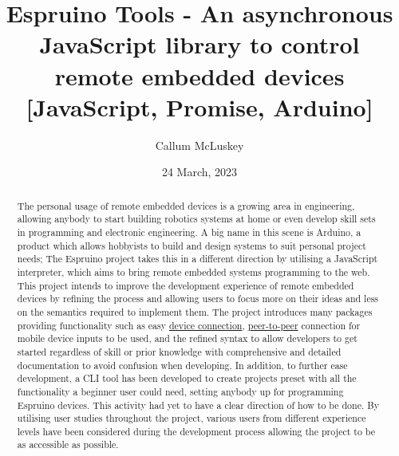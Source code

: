 \documentclass{l4proj}
\begin{document}
\title{Espruino Tools - An asynchronous JavaScript library to control remote embedded devices [JavaScript, Promise, Arduino]}
\author{Callum McLuskey}
\date{24 March, 2023}


\maketitle

\begin{abstract}

    The personal usage of remote embedded devices is a growing area in engineering, allowing anybody to start building robotics systems at home or even develop skill sets in programming and electronic engineering. A big name in this scene is Arduino, a product which allows hobbyists to build and design systems to suit personal project needs; The Espruino project takes this in a different direction by utilising a JavaScript interpreter, which aims to bring remote embedded systems programming to the web. This project intends to improve the development experience of remote embedded devices by refining the process and allowing users to focus more on their ideas and less on the semantics required to implement them. The project introduces many packages providing functionality such as easy \href{https://github.com/espruino-tools/core}{device connection}, \href{https://github.com/espruino-tools/peer}{peer-to-peer} connection for mobile device inputs to be used, and the refined syntax to allow developers to get started regardless of skill or prior knowledge with comprehensive and detailed documentation to avoid confusion when developing. In addition, to further ease development, a CLI tool has been developed to create projects preset with all the functionality a beginner user could need, setting anybody up for programming Espruino devices. This activity had yet to have a clear direction of how to be done. By utilising user studies throughout the project, various users from different experience levels have been considered during the development process allowing the project to be as accessible as possible.

\end{abstract}

\def\consentname {Callum McLuskey} %
\def\consentdate {23 March 2023} %
\end{document}
